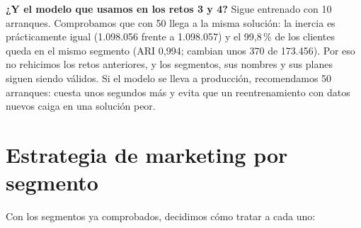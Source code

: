 \documentclass[11pt,a4paper]{article}
\begin{document}
\textbf{¿Y el modelo que usamos en los retos 3 y 4?} Sigue entrenado con 10 arranques. Comprobamos que con 50 llega a la misma solución: la inercia es prácticamente igual (1.098.056 frente a 1.098.057) y el 99,8\,\% de los clientes queda en el mismo segmento (ARI 0,994; cambian unos 370 de 173.456). Por eso no rehicimos los retos anteriores, y los segmentos, sus nombres y sus planes siguen siendo válidos. Si el modelo se lleva a producción, recomendamos 50 arranques: cuesta unos segundos más y evita que un reentrenamiento con datos nuevos caiga en una solución peor.

\clearpage
\section{Estrategia de marketing por segmento}

Con los segmentos ya comprobados, decidimos cómo tratar a cada uno:
\end{document}
